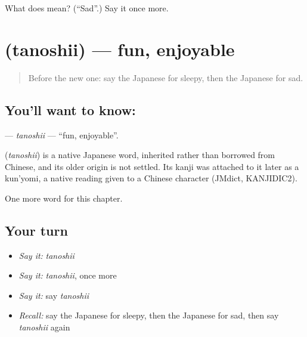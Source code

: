 \begin{tcolorbox}[breakable,colback=teal!4,colframe=teal!35!black,title={Before you move on}]
What does  mean? (\textquotedblleft{}Sad\textquotedblright{}.) Say it once more.
\end{tcolorbox}
\section[\texorpdfstring{\ja{たのしい} (tanoshii)}{たのしい (tanoshii)}]{ (tanoshii) — fun, enjoyable}

\label{lesson:JA-C23-tanoshii}



\begin{quote}
Before the new one: say the Japanese for sleepy, then the Japanese for sad.
\end{quote}

\subsection*{You'll want to know: }
\textbf{} — \emph{tanoshii} — \textquotedblleft{}fun, enjoyable\textquotedblright{}.

\begin{cousinweb}
\textbf{} (\emph{tanoshii}) is a native Japanese word, inherited rather than borrowed from Chinese, and its older origin is not settled. Its kanji was attached to it later as a kun'yomi, a native reading given to a Chinese character (JMdict, KANJIDIC2).
\end{cousinweb}

\begin{grammarlens}[title={What you've built}]
One more word for this chapter.
\end{grammarlens}

\subsection*{Your turn}
\begin{itemize}
\raggedright
  \item \emph{Say it:} \emph{tanoshii}
  \item \emph{Say it:} \emph{tanoshii}, once more
  \item \emph{Say it:} say \emph{tanoshii}
  \item \emph{Recall:} say the Japanese for sleepy, then the Japanese for sad, then say \emph{tanoshii} again
\end{itemize}

